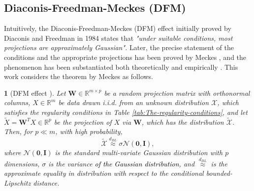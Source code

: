 \documentclass[USenglish,oneside,twocolumn]{article}
\theoremstyle{definition}
\theoremstyle{remark}
\theoremstyle{plain}
\newtheorem{thm}{\protect\theoremname}
\theoremstyle{plain}
\providecommand{\theoremname}{Theorem}
\newcommand{\chang}{\textcolor{black}}
\begin{document}
\vspace{-1em}
\subsection{Diaconis-Freedman-Meckes (DFM) \label{subsec:Diaconis-Freedman-Effect}}

Intuitively, the Diaconis-Freedman-Meckes (DFM) effect \textendash{}
initially proved by Diaconis and Freedman in 1984 \cite{RefWorks:435}
\textendash{} states that \emph{"under suitable conditions,
most projections are approximately Gaussian". }Later,
the precise statement of the conditions and the appropriate projections
has been proved by Meckes \cite{RefWorks:439,RefWorks:513}, and the
phenomenon has been substantiated both theoretically \cite{RefWorks:436}
and empirically \cite{RefWorks:437,RefWorks:445}. This work
considers the theorem by Meckes \cite{RefWorks:439} as follows.
\begin{table}
\begin{centering}
\noindent{}
\par\end{centering}
\caption{The regularity conditions for the DFM effect. $\sigma$ is the variance
defined in Theorem \ref{thm:proj_is_gauss}, $c>0$ is a constant,
and $\mathbb{S}^{m-1}$ is the topological sphere (cf. \cite{RefWorks:524}).
\label{tab:The-regularity-conditions}}
\vspace{-1em}
\end{table}
\begin{thm}[{DFM effect \cite[Corollary 4]{RefWorks:439}}]
\label{thm:proj_is_gauss}Let $\mathbf{W}\in\mathbb{R}^{m\times p}$
be a random projection matrix with orthonormal columns, $X\in\mathbb{R}^{m}$
be data drawn i.i.d. from an unknown distribution $\mathcal{X}$,
which satisfies the regularity conditions in Table \ref{tab:The-regularity-conditions},
and let $\widetilde{X}=\mathbf{W}^{T}X\in\mathbb{R}^{p}$ be the projection
of $X$ via $\mathbf{W}$, which has the distribution $\widetilde{\mathcal{X}}$.
Then, for $p\ll m$, with high probability,
\[
\widetilde{\mathcal{X}}\overset{d_{BL}}{\approx}\sigma\mathcal{N}(\mathbf{0},\mathbf{I}),
\]
where $\mathcal{N}(\mathbf{0},\mathbf{I})$ is the standard multi-variate Gaussian distribution with $p$ dimensions, $\sigma$ is the variance \chang{of the Gaussian distribution}, and $\overset{d_{BL}}{\approx}$ is the approximate
equality in distribution with respect to the conditional bounded-Lipschitz
distance.
\end{thm}
\end{document}
